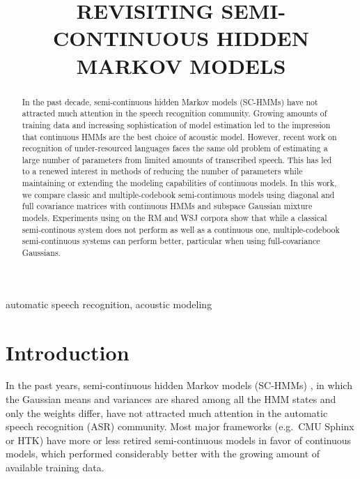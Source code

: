 \documentclass{article}
\title{REVISITING SEMI-CONTINUOUS HIDDEN MARKOV MODELS}
\begin{document}
\ninept

\maketitle

\begin{abstract}
In the past decade, semi-continuous hidden Markov models (SC-HMMs) have not 
attracted much attention in the speech recognition community. Growing amounts 
of training data and increasing sophistication of model estimation led to the 
impression that continuous HMMs are the best choice of acoustic model.
%
However, recent work on recognition of under-resourced languages faces the same
old problem of estimating a large number of parameters from limited amounts 
of transcribed speech.
This has led to a renewed interest in methods of reducing the number of parameters 
while maintaining or extending the modeling capabilities of continuous models.
%
In this work, we compare classic and multiple-codebook semi-continuous models
using diagonal and full covariance matrices with continuous HMMs and subspace Gaussian 
mixture models.  
Experiments using on the RM and WSJ corpora show that while a classical semi-continous
system does not perform as well as a continuous one, multiple-codebook semi-continuous
systems can perform better, particular when using full-covariance Gaussians.
\end{abstract}

\begin{keywords}
automatic speech recognition, acoustic modeling
\end{keywords}

\section{Introduction}
\label{sec:intro}
In the past years, semi-continuous hidden Markov models (SC-HMMs) \cite{huang1989shm},
in which the Gaussian means and variances are shared among all the HMM states
and only the weights differ, have not attracted much attention in the automatic 
speech recognition (ASR) community. 
Most major frameworks (e.g.~CMU {\sc Sphinx} or HTK) have more or less retired
semi-continuous models in favor of continuous models, which performed 
considerably better with the growing amount of available training data.
\end{document}
